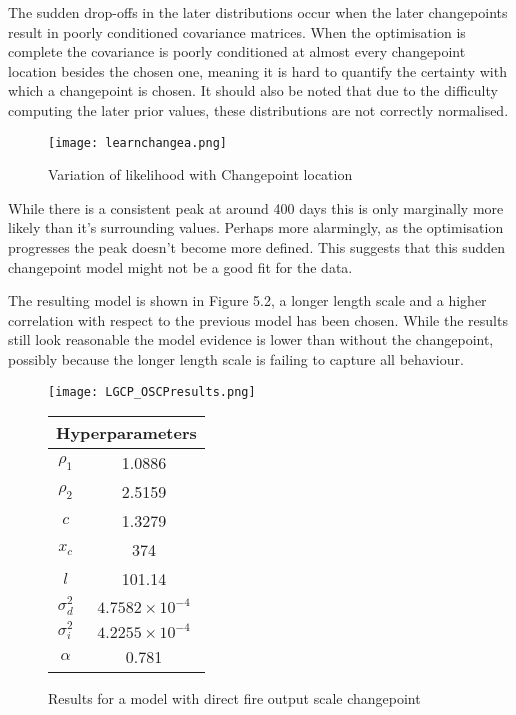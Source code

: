 \documentclass[a4paper,11pt]{report}
\begin{document}
The sudden drop-offs in the later distributions occur when the later changepoints result in poorly conditioned covariance matrices. When the optimisation is complete the covariance is poorly conditioned at almost every changepoint location besides the chosen one, meaning it is hard to quantify the certainty with which a changepoint is chosen. It should also be noted that due to the difficulty computing the later prior values, these distributions are not correctly normalised.

\begin{figure}
\centering
\texttt{[image: learnchangea.png]}
\caption{Variation of likelihood with Changepoint location}
\label{fig:oscpvariation}
\end{figure}

While there is a consistent peak at around 400 days this is only marginally more likely than it's surrounding values. Perhaps more alarmingly, as the optimisation progresses the peak doesn't become more defined. This suggests that this sudden changepoint model might not be a good fit for the data.

The resulting model is shown in Figure 5.2, a longer length scale and a higher correlation with respect to the previous model has been chosen. While the results still look reasonable the model evidence is lower than without the changepoint, possibly because the longer length scale is failing to capture all behaviour. 

  \begin{figure}[!ht]
    \centering
    \texttt{[image: LGCP\_OSCPresults.png]}
    \qquad
    \doublespacing
    \begin{tabular}[b]{cc}
    \multicolumn{2}{c}{\textbf{Hyperparameters}}                                            \\ \hline
      \(\rho_1\)                    & 1.0886                \\                       
\(\rho_2\)                     & 2.5159                           \\            
\(c\)                               & 1.3279                                      \\ 
\(x_c\)                        & 374                                         \\ 
\(l\)                               & 101.14                                      \\  
\(\sigma_d^2\) & \(4.7582 \times 10^{-4}\) \\ 
\(\sigma_i^2\) & \(4.2255 \times 10^{-4}\) \\ 
\(\alpha\)                      & 0.781              \\                      
    \end{tabular}
    \captionsetup{labelformat=andtable}
    \caption{Results for a model with direct fire output scale changepoint}
  \end{figure}
\end{document}
